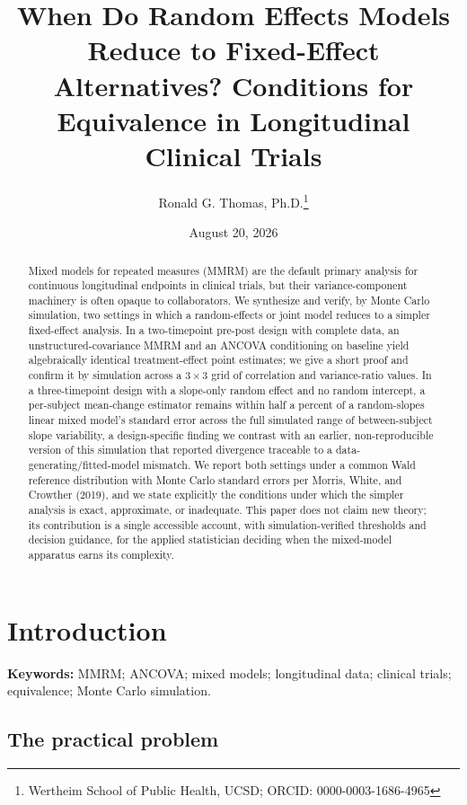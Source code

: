 \documentclass[
  11pt,
]{article}
\title{When Do Random Effects Models Reduce to Fixed-Effect Alternatives? Conditions for Equivalence in Longitudinal Clinical Trials}
\author{Ronald G. Thomas, Ph.D.\thanks{Wertheim School of Public Health, UCSD; ORCID: 0000-0003-1686-4965}}
\date{August 20, 2026}
\begin{document}
\maketitle
\begin{abstract}
Mixed models for repeated measures (MMRM) are the default
primary analysis for continuous longitudinal endpoints in
clinical trials, but their variance-component machinery is
often opaque to collaborators. We synthesize and verify, by
Monte Carlo simulation, two settings in which a random-effects
or joint model reduces to a simpler fixed-effect analysis. In
a two-timepoint pre-post design with complete data, an
unstructured-covariance MMRM and an ANCOVA conditioning on
baseline yield algebraically identical treatment-effect point
estimates; we give a short proof and confirm it by simulation
across a \(3 \times 3\) grid of correlation and variance-ratio
values. In a three-timepoint design with a slope-only random
effect and no random intercept, a per-subject mean-change
estimator remains within half a percent of a random-slopes
linear mixed model's standard error across the full simulated
range of between-subject slope variability, a design-specific
finding we contrast with an earlier, non-reproducible version of
this simulation that reported divergence traceable to a
data-generating/fitted-model mismatch. We report both settings
under a common Wald reference distribution with Monte Carlo
standard
errors per Morris, White, and Crowther (2019), and we state
explicitly the conditions under which the simpler analysis is
exact, approximate, or inadequate. This paper does not claim new
theory; its contribution is a single accessible account, with
simulation-verified thresholds and decision guidance, for the
applied statistician deciding when the mixed-model apparatus
earns its complexity.
\end{abstract}

{
\setcounter{tocdepth}{2}
\tableofcontents
}
\section{Introduction}\label{introduction}

\textbf{Keywords:} MMRM; ANCOVA; mixed models; longitudinal data;
clinical trials; equivalence; Monte Carlo simulation.

\subsection{The practical problem}\label{the-practical-problem}
\end{document}
